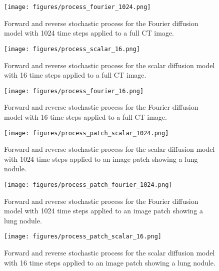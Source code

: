 \documentclass[12pt,]{article}
\begin{document}
\begin{figure}[ht!]
    \centering
\texttt{[image: figures/process\_fourier\_1024.png]}
    \caption{Forward and reverse stochastic process for the Fourier diffusion model with 1024 time steps applied to a full CT image.  }
    \label{fig:process_fourier_1024}
\end{figure}

\begin{figure}[ht!]
    \centering
\texttt{[image: figures/process\_scalar\_16.png]}
    \caption{Forward and reverse stochastic process for the scalar diffusion model with 16 time steps applied to a full CT image.  }
    \label{fig:process_scalar_16}
\end{figure}

\begin{figure}[ht!]
    \centering
\texttt{[image: figures/process\_fourier\_16.png]}
    \caption{Forward and reverse stochastic process for the Fourier diffusion model with 16 time steps applied to a full CT image. }
    \label{fig:process_fourier_16}
\end{figure}






\begin{figure}[ht!]
    \centering
\texttt{[image: figures/process\_patch\_scalar\_1024.png]}
    \caption{Forward and reverse stochastic process for the scalar diffusion model with 1024 time steps applied to an image patch showing a lung nodule.  }
    \label{fig:process_patch_scalar_1024}
\end{figure}

\begin{figure}[ht!]
    \centering
\texttt{[image: figures/process\_patch\_fourier\_1024.png]}
    \caption{Forward and reverse stochastic process for the Fourier diffusion model with 1024 time steps applied to an image patch showing a lung nodule. }
    \label{fig:process_patch_fourier_1024}
\end{figure}

\begin{figure}[ht!]
    \centering
\texttt{[image: figures/process\_patch\_scalar\_16.png]}
    \caption{Forward and reverse stochastic process for the scalar diffusion model with 16 time steps applied to an image patch showing a lung nodule.  }
    \label{fig:process_patch_scalar_16}
\end{figure}
\end{document}
